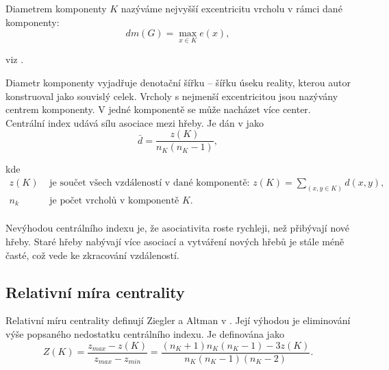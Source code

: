\documentclass[dp.tex]{subfiles}
\begin{document}
Diametrem komponenty $K$ nazýváme nejvyšší excentricitu vrcholu v rámci dané komponenty:
\begin{equation}
dm(G)=\max_{x \in K} e(x),
\end{equation}

viz \cite[str. 315]{Wimmer2003}.

Diametr komponenty vyjadřuje denotační šířku -- šířku úseku reality, kterou autor konstruoval jako souvislý celek. Vrcholy s nejmenší excentricitou jsou nazývány centrem komponenty. V jedné komponentě se může nacházet více center.
Centrální index udává sílu asociace mezi hřeby. Je dán v \cite[str. 315]{Wimmer2003} jako
\begin{equation}
\bar{d}=\frac{z(K)}{n_K (n_K-1)},
\end{equation}

kde
\begin{align*}
	z(K) & \text{ je součet všech vzdáleností v dané komponentě: 
$z(K)=\sum_{(x,y \in K)} d(x,y)$,}\\
	n_k & \text{ je počet vrcholů v komponentě $K$.}\\
\end{align*} 

Nevýhodou centrálního indexu je, že asociativita roste rychleji, než přibývají nové hřeby. Staré hřeby nabývají více asociací a vytváření nových hřebů je stále méně časté, což vede ke zkracování vzdáleností.


\subsection{Relativní míra centrality}
Relativní míru centrality definují Ziegler a Altman v \cite[str. 315]{ZieglerAltmann2002}. Její výhodou je eliminování výše popsaného nedostatku centrálního indexu. Je definována jako
\begin{equation}
Z(K)=\frac{z_{max}-z(K)}{z_{max}-z_{min}}=
\frac{(n_K+1) n_K (n_K-1)-3z(K)}{n_K (n_K-1)(n_K-2)} .
\end{equation}
\end{document}
